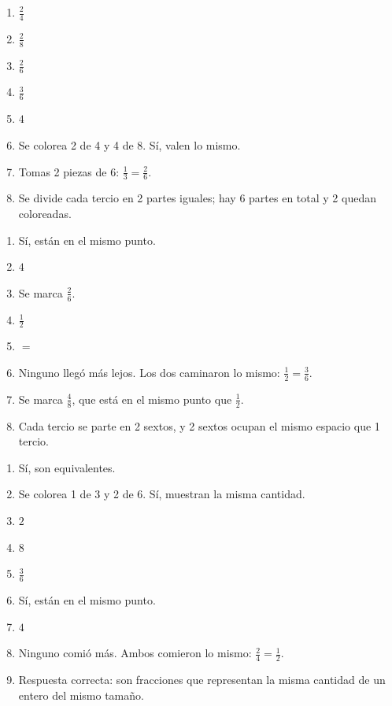 \begin{enumerate}
\item $\frac{2}{4}$
\item $\frac{2}{8}$
\item $\frac{2}{6}$
\item $\frac{3}{6}$
\item $4$
\item Se colorea 2 de 4 y 4 de 8. Sí, valen lo mismo.
\item Tomas 2 piezas de 6: $\frac{1}{3}=\frac{2}{6}$.
\item Se divide cada tercio en 2 partes iguales; hay 6 partes en total y 2 quedan coloreadas.
\end{enumerate}

\begin{enumerate}
\item Sí, están en el mismo punto.
\item $4$
\item Se marca $\frac{2}{6}$.
\item $\frac{1}{2}$
\item $=$
\item Ninguno llegó más lejos. Los dos caminaron lo mismo: $\frac{1}{2}=\frac{3}{6}$.
\item Se marca $\frac{4}{8}$, que está en el mismo punto que $\frac{1}{2}$.
\item Cada tercio se parte en 2 sextos, y 2 sextos ocupan el mismo espacio que 1 tercio.
\end{enumerate}

\wbanswers{\wbLReview}
\begin{enumerate}
\item Sí, son equivalentes.
\item Se colorea 1 de 3 y 2 de 6. Sí, muestran la misma cantidad.
\item $2$
\item $8$
\item $\frac{3}{6}$
\item Sí, están en el mismo punto.
\item $4$
\item Ninguno comió más. Ambos comieron lo mismo: $\frac{2}{4}=\frac{1}{2}$.
\item Respuesta correcta: son fracciones que representan la misma cantidad de un entero del mismo tamaño.
\end{enumerate}
